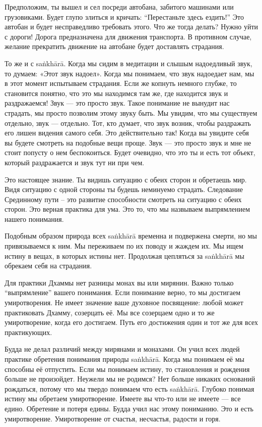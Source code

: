 Предположим, ты вышел и сел посреди автобана, забитого машинами или грузовиками. Будет глупо злиться и кричать: “Перестаньте здесь ездить!” Это автобан и будет несправедливо требовать этого. Что же тогда делать? Нужно уйти с дороги! Дорога предназначена для движения транспорта. В противном случае, желание прекратить движение на автобане будет доставлять страдания.

То же и с sa\.nkh\={a}r\={a}. Когда мы сидим в медитации и слышым надоедливый звук, то думаем: «Этот звук надоел». Когда мы понимаем, что звук надоедает нам, мы в этот момент испытываем страдания. Если же копнуть немного глубже, то становится понятно, что это мы находимся там же, где находится звук и раздражаемся! Звук — это просто звук. Такое понимание не вынудит нас страдать, мы просто позволим этому звуку быть. Мы увидим, что мы существуем отдельно, звук — отдельно. Тот, кто думает, что звук возник, чтобы раздражать его лишен видения самого себя. Это действительно так! Когда вы увидите себя вы будете смотреть на подобные вещи проще. Звук — это просто звук и мне не стоит попусту о нем беспокоиться. Будет очевидно, что это ты и есть тот объект, который раздражается и звук тут ни при чем.

Это настоящее знание. Ты видишь ситуацию с обеих сторон и обретаешь мир. Видя ситуацию с одной стороны ты будешь неминуемо страдать. Следование Срединному пути – это развитие способности смотреть на ситуацию с обеих сторон. Это верная практика для ума. Это то, что мы назвываем выпрямлением нашего понимания.

Подобным образом природа всех sa\.nkh\={a}r\={a} временна и подвержена смерти, но мы привязываемся к ним. Мы переживаем по их поводу и жаждем их. Мы ищем истину в вещах, в которых истины нет. Продолжая цепляться за sa\.nkh\={a}r\={a} мы обрекаем себя на страдания.

Для практики Дхаммы нет разницы монах вы или мирянин. Важно только “выпрямление” вашего понимания. Если понимание верно, то мы достигаем умиротворения. Не имеет значение ваше духовное посвящение: любой может практиковать Дхамму, созерцать её. Мы все созерцаем одно и то же умиротворение, когда его достигаем. Путь его достижения один и тот же для всех практикующих.

Будда не делал различий между мирянами и монахами. Он учил всех людей практике обретения понимания природы sa\.nkh\={a}r\={a}. Когда мы понимаем её мы способны её отпустить. Если мы понимаем истину, то становления и рождения больше не произойдет. Неужели мы не родимся? Нет больше никаких оснований рождаться, потому что мы твердо понимаем что есть sa\.nkh\={a}r\={a}. Глубоко понимая истину мы обретаем умиротворение. Имеете вы что-то или не имеете — все едино. Обретение и потеря едины. Будда учил нас этому пониманию. Это и есть умиротворение. Умиротворение от счастья, несчастья, радости и горя.

